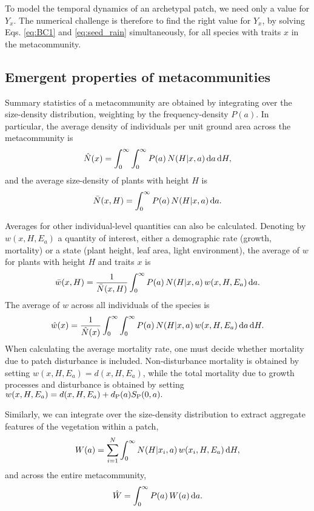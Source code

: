 \documentclass[10pt,twoside]{article}
\begin{document}
To model the temporal dynamics of an archetypal patch, we need only a
value for \(Y_x\). The numerical challenge is therefore to find the
right value for \(Y_x\), by solving Eqs. \ref{eq:BC1} and
\ref{eq:seed_rain} simultaneously, for all species with traits $x$ in the metacommunity.

\subsection{Emergent properties of
metacommunities}\label{emergent-properties-of-metapopulation}

Summary statistics of a metacommunity are obtained by integrating
over the size-density distribution, weighting by the frequency-density \(P(a)\).
In particular, the average density of individuals per unit ground area across the metacommunity is
\begin{equation}
\hat{N}(x) = \int_{0}^{\infty} \int_{0}^{\infty} P(a) \, N(H | x, a) \, {\rm d}a \, {\rm d}H,
\end{equation}
and the average size-density of plants with height \(H\) is
\begin{equation}
\bar{N}(x, H) = \int_{0}^{\infty}P(a) \, N(H | x, a) \, {\rm d}a.
\end{equation}

Averages for other individual-level quantities can also be calculated.
Denoting by
\(w(x, H, E_a)\) a quantity of interest, either a demographic rate
(growth, mortality) or a state (plant height, leaf area, light environment),
the average of \(w\) for plants with height $H$ and traits $x$ is
\begin{equation}\bar{w}(x, H) = \frac1{\bar{N}(x, H)}\int_{0}^{\infty}P(a) \, N(H | x, a) \, w(x, H, E_a) \, {\rm d}a.
\end{equation}
The average of \(w\) across all individuals of the species is
\begin{equation}
\hat{w}(x) = \frac1{\hat{N}(x) }\int_{0}^{\infty} \int_{0}^{\infty}P(a) \, N(H | x, a) \, w(x, H, E_a) \, {\rm d}a \, {\rm d}H.
\end{equation}
When calculating the average mortality rate, one must decide whether
mortality due to patch disturbance is included. Non-disturbance mortality
is obtained by setting \(w(x, H, E_a) = d(x, H, E_a)\), while the total
mortality due to growth processes and disturbance is obtained by setting
\(w(x, H, E_a) = d(x, H, E_a) + d_{\rm P}(a) S_{\rm P}(0, a).\)

Similarly, we can integrate over the size-density distribution to extract aggregate
features of the vegetation within a patch,
\begin{equation}
W(a) = \sum_{i = 1}^{N} \int_{0}^{\infty} N(H | x_i, a)\, w(x_i, H, E_a) \, {\rm d}H,
\end{equation}
and across the entire metacommunity,
\begin{equation}
\hat{W} = \int_{0}^{\infty} P(a) \, W(a) \, {\rm d}a.
\end{equation}
\end{document}
